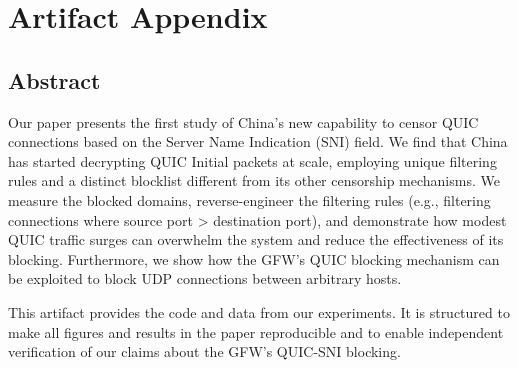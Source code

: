 
\appendix
\section{Artifact Appendix}


\subsection{Abstract}

Our paper presents the first study of China's new capability
to censor QUIC connections based on the Server Name Indication (SNI)
field. We find that China has started decrypting QUIC
Initial packets at scale, employing unique filtering rules
and a distinct blocklist different from its other censorship
mechanisms. We measure the blocked domains, reverse-engineer
the filtering rules (e.g., filtering connections where source port > destination port),
and demonstrate how modest QUIC traffic surges can overwhelm
the system and reduce the effectiveness of its blocking.
Furthermore, we show how the GFW's QUIC blocking mechanism
can be exploited to block UDP connections between arbitrary hosts. 

This artifact provides the code and data from our experiments.
It is structured to make all figures and results in the paper
reproducible and to enable independent verification of our claims
about the GFW's QUIC-SNI blocking.


